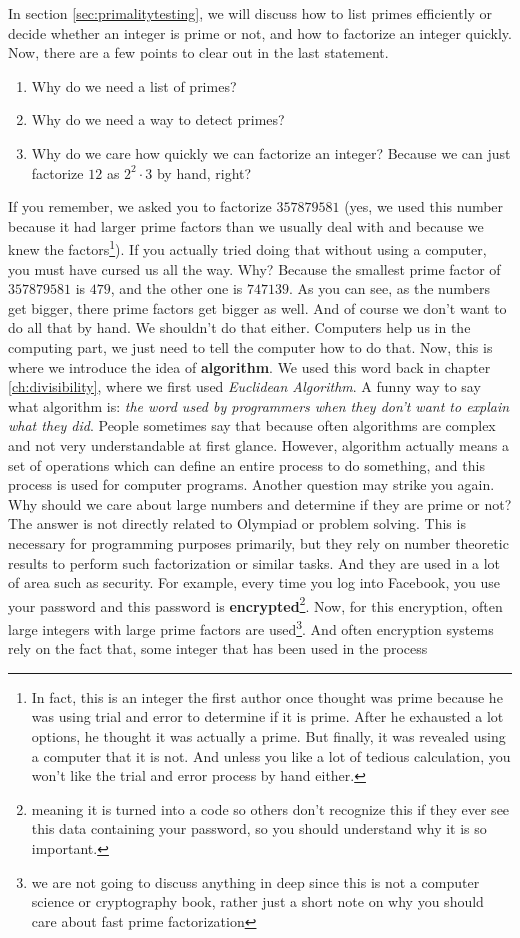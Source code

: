 \documentclass{subfiles}
\begin{document}
	In section \eqref{sec:primalitytesting}, we will discuss how to list primes efficiently or decide whether an integer is prime or not, and how to factorize an integer quickly. Now, there are a few points to clear out in the last statement.
		\begin{enumerate}
			\item Why do we need a list of primes?
			\item Why do we need a way to detect primes?
			\item Why do we care how quickly we can factorize an integer? Because we can just factorize $12$ as $2^2\cdot3$ by hand, right?
		\end{enumerate}
	If you remember, we asked you to factorize $357879581$ (yes, we used this number because it had larger prime factors than we usually deal with and because we knew the factors\footnote{In fact, this is an integer the first author once thought was prime because he was using trial and error to determine if it is prime. After he exhausted a lot options, he thought it was actually a prime. But finally, it was revealed using a computer that it is not. And unless you like a lot of tedious calculation, you won't like the trial and error process by hand either.}). If you actually tried doing that without using a computer, you must have cursed us all the way. Why? Because the smallest prime factor of $357879581$ is $479$, and the other one is $747139$. As you can see, as the numbers get bigger, there prime factors get bigger as well. And of course we don't want to do all that by hand. We shouldn't do that either. Computers help us in the computing part, we just need to tell the computer how to do that. Now, this is where we introduce the idea of \textbf{algorithm}. We used this word back in chapter \eqref{ch:divisibility}, where we first used \textit{Euclidean Algorithm}. A funny way to say what algorithm is: \textit{the word used by programmers when they don't want to explain what they did}. People sometimes say that because often algorithms are complex and not very understandable at first glance. However, algorithm actually means a set of operations which can define an entire process to do something, and this process is used for computer programs. Another question may strike you again. Why should we care about large numbers and determine if they are prime or not? The answer is not directly related to Olympiad or problem solving. This is necessary for programming purposes primarily, but they rely on number theoretic results to perform such factorization or similar tasks. And they are used in a lot of area such as security. For example, every time you log into Facebook, you use your password and this password is \textbf{encrypted}\footnote{meaning it is turned into a code so others don't recognize this if they ever see this data containing your password, so you should understand why it is so important.}. Now, for this encryption, often large integers with large prime factors are used\footnote{we are not going to discuss anything in deep since this is not a computer science or cryptography book, rather just a short note on why you should care about fast prime factorization}. And often encryption systems rely on the fact that, some integer that has been used in the process 
\end{document}
